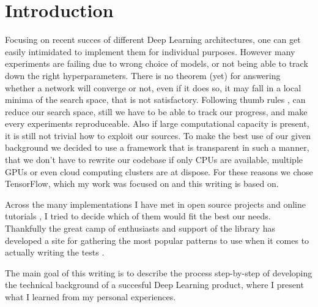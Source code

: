 \section{Introduction}

Focusing on recent succes of different Deep Learning architectures, one can get easily intimidated to implement them for individual purposes.
However many experiments are failing due to wrong choice of models, or not being able to track down the right hyperparameters.
There is no theorem (yet) for answering whether a network will converge or not, even if it does so, it may fall in a local minima of the search space, that is not satisfactory.
Following thumb rules \cite{thumbrules?}, can reduce our search space, still we have to be able to track our progress, and make every experiments reproduceable.
Also if large computational capacity is present, it is still not trivial how to exploit our sources. To make the best use of our given background we decided to use a framework that is transparent in such a manner, that we don't have to rewrite our codebase if only CPUs are available, multiple GPUs or even cloud computing clusters are at dispose. For these reasons we chose TensorFlow, which my work was focused on and this writing is based on.

Across the many implementations I have met in open source projects \cite{OSS?} and online tutorials \cite{wildml - metaflow - etc}, I tried to decide which of them would fit the best our needs.
Thankfully the great camp of enthusiasts and support of the library has developed a site for gathering the most popular patterns to use when it comes to actually writing the tests \cite{tensorflow-patterns}.

The main goal of this writing is to describe the process step-by-step of developing the technical background of a succesful Deep Learning product, where I present what I learned from my personal experiences.
